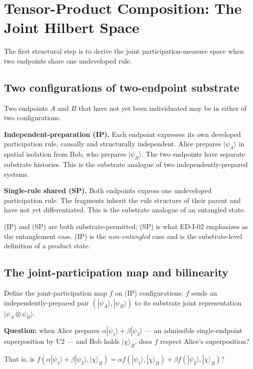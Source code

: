 \documentclass[11pt,a4paper]{article}
\begin{document}
\section{Tensor-Product Composition: The Joint Hilbert Space}

The first structural step is to derive the joint participation-measure space when two endpoints share one undeveloped rule.

\subsection{Two configurations of two-endpoint substrate}

Two endpoints $A$ and $B$ that have not yet been individuated may be in either of two configurations.

\textbf{Independent-preparation (IP).} Each endpoint expresses its own developed participation rule, causally and structurally independent. Alice prepares $|\psi_A\rangle$ in spatial isolation from Bob, who prepares $|\psi_B\rangle$. The two endpoints have separate substrate histories. This is the substrate analogue of two independently-prepared systems.

\textbf{Single-rule shared (SP).} Both endpoints express one undeveloped participation rule. The fragments inherit the rule structure of their parent and have not yet differentiated. This is the substrate analogue of an entangled state.

(IP) and (SP) are both substrate-permitted; (SP) is what ED-I-02 emphasizes as the entanglement case. (IP) is the \emph{non-entangled} case and is the substrate-level definition of a product state.

\subsection{The joint-participation map and bilinearity}

Define the joint-participation map $f$ on (IP) configurations: $f$ sends an independently-prepared pair $(|\psi_A\rangle, |\psi_B\rangle)$ to its substrate joint representation $|\psi_A \otimes \psi_B\rangle$.

\textbf{Question:} when Alice prepares $\alpha|\psi_1\rangle + \beta|\psi_2\rangle$ --- an admissible single-endpoint superposition by U2 --- and Bob holds $|\chi\rangle_B$, does $f$ respect Alice's superposition?

That is, is $f(\alpha|\psi_1\rangle + \beta|\psi_2\rangle, |\chi\rangle_B) = \alpha f(|\psi_1\rangle, |\chi\rangle_B) + \beta f(|\psi_2\rangle, |\chi\rangle_B)$?
\end{document}
